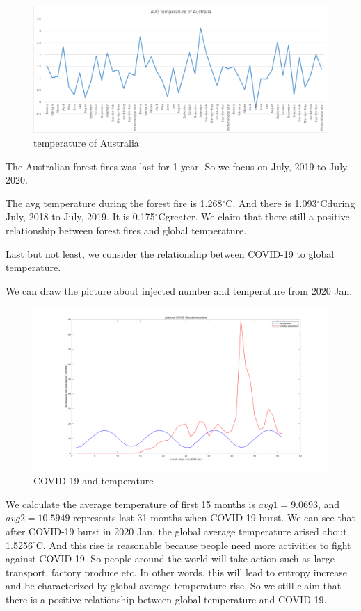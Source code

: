 \documentclass{apmcmthesis}
\def\oc{$^{\circ}$C\;}
\begin{document}
  \begin{figure}[htbp]
    \centering
    \includegraphics[scale=0.5]{Australia.png}
    \caption{temperature of Australia}
  \end{figure}
  
  The Australian forest fires was last for 1 year.
  So we focus on July, 2019 to July, 2020.
  
  The avg temperature during the forest fire is 1.268\oc.
  And there is 1.093\oc during July, 2018 to July, 2019.
  It is 0.175\oc greater.
  We claim that there still a positive relationship between forest fires and global temperature.
  
  Last but not least, we consider the relationship between COVID-19 to global temperature.
  
  We can draw the picture about injected number and temperature from 2020 Jan. 
  
  \begin{figure}[htbp]
    \centering
    \includegraphics[scale=0.2]{COVID-19.png}
    \caption{COVID-19 and temperature}
  \end{figure}
  
  We calculate the average temperature of first 15 months is $avg1=9.0693$,
  and $avg2=10.5949$ represents last 31 months when COVID-19 burst. 
  We can see that after COVID-19 burst in 2020 Jan, the global average temperature arised about 1.5256\oc.
  And this rise is reasonable because people need more activities to fight against COVID-19.
  So people around the world will take action such as large transport, factory produce etc. 
  In other words, this will lead to entropy increase and be characterized by global average temperature rise.
  So we still claim that there is a positive relationship between global temperature and COVID-19.
  
\end{document}
